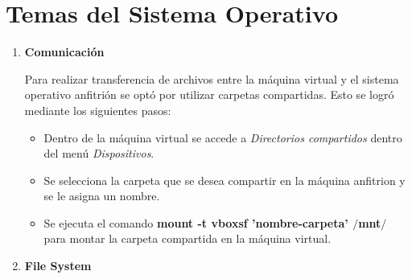 \documentclass[a4paper,11pt] {article}
\begin{document}
\section*{Temas del Sistema Operativo}

\begin{enumerate}
  \item \textbf{Comunicaci\'on}

    Para realizar transferencia de archivos entre la m\'aquina virtual y el sistema operativo anfitri\'on se opt\'o por utilizar carpetas compartidas. Esto se logr\'o mediante los siguientes pasos:
    \begin{itemize}
      \item Dentro de la m\'aquina virtual se accede a \textit{Directorios compartidos} dentro del men\'u \textit{Dispositivos}.
      \item Se selecciona la carpeta que se desea compartir en la m\'aquina anfitrion y se le asigna un nombre.
      \item Se ejecuta el comando \textbf{mount -t vboxsf 'nombre-carpeta' $/$mnt$/$} para montar la carpeta compartida en la m\'aquina virtual.
    \end{itemize}

  \item \textbf{File System}


\end{enumerate}
\end{document}
